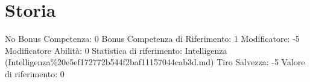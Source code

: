 \section{Storia}\label{storia}

\begin{description}
\tightlist
\item[Tags: ABI]
No Bonus Competenza: 0 Bonus Competenza di Riferimento: 1 Modificatore:
-5 Modificatore Abilità: 0 Statistica di riferimento: Intelligenza
(Intelligenza\%20e5ef172772b544f2baf11157044cab3d.md) Tiro Salvezza: -5
Valore di riferimento: 0
\end{description}

